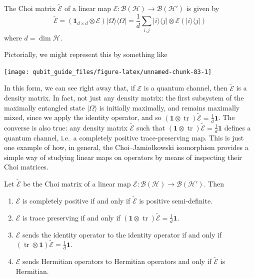 \documentclass[fleqn,a4paper]{article}
\providecommand{\tightlist}{\setlength{\itemsep}{0pt}\setlength{\parskip}{0pt}}
\newenvironment{idea}{\everypar{\setlength{\parindent}{1.5em}}}{}
\theoremstyle{definition}
\theoremstyle{definition}
\theoremstyle{definition}
\theoremstyle{definition}
\theoremstyle{remark}
\begin{document}
\begin{idea}

The Choi matrix \(\widetilde{\mathcal{E}}\) of a linear map \(\mathcal{E}\colon\mathcal{B}(\mathcal{H})\to\mathcal{B}(\mathcal{H'})\) is given by
\[
  \widetilde{\mathcal{E}}
  = (\mathbf{1}_{d\times d}\otimes\mathcal{E})|\Omega\rangle\langle\Omega|
  = \frac{1}{d} \sum_{i,j} |i\rangle\langle j|\otimes\mathcal{E}(|i\rangle\langle j|)
\]
where \(d=\dim\mathcal{H}\).

Pictorially, we might represent this by something like

\begin{center}\texttt{[image: qubit\_guide\_files/figure-latex/unnamed-chunk-83-1]} \end{center}

\end{idea}

In this form, we can see right away that, if \(\mathcal{E}\) is a quantum channel, then \(\widetilde{\mathcal{E}}\) is a density matrix.
In fact, not just any density matrix: the first subsystem of the maximally entangled state \(|\Omega\rangle\) is initially maximally, and remains maximally mixed, since we apply the identity operator, and so \((\mathbf{1}\otimes\operatorname{tr})\widetilde{\mathcal{E}}=\frac{1}{d}\mathbf{1}\).
The converse is also true: any density matrix \(\widetilde{\mathcal{E}}\) such that \((\mathbf{1}\otimes\operatorname{tr})\widetilde{\mathcal{E}}=\frac{1}{d}\mathbf{1}\) defines a quantum channel, i.e.~a completely positive trace-preserving map.
This is just one example of how, in general, the Choi--Jamiołkowski isomorphism provides a simple way of studying linear maps on operators by means of inspecting their Choi matrices.

\begin{idea}

Let \(\widetilde{\mathcal{E}}\) be the Choi matrix of a linear map \(\mathcal{E}\colon\mathcal{B}(\mathcal{H})\to\mathcal{B}(\mathcal{H'})\).
Then

\begin{enumerate}
\def\labelenumi{\arabic{enumi}.}
\tightlist
\item
  \(\mathcal{E}\) is completely positive if and only if \(\widetilde{\mathcal{E}}\) is positive semi-definite.
\item
  \(\mathcal{E}\) is trace preserving if and only if \((\mathbf{1}\otimes\operatorname{tr})\widetilde{\mathcal{E}}=\frac{1}{d}\mathbf{1}\).
\item
  \(\mathcal{E}\) sends the identity operator to the identity operator if and only if \((\operatorname{tr}\otimes\mathbf{1})\widetilde{\mathcal{E}}=\frac{1}{d}\mathbf{1}\).
\item
  \(\mathcal{E}\) sends Hermitian operators to Hermitian operators and only if \(\widetilde{\mathcal{E}}\) is Hermitian.
\end{enumerate}

\end{idea}
\end{document}
